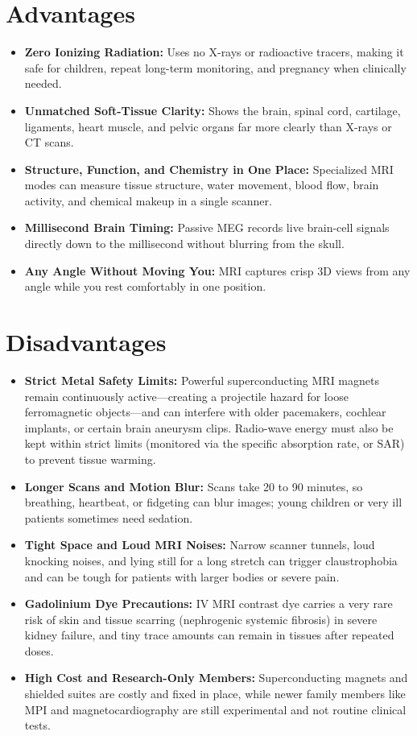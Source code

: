 \section{Advantages}
\begin{itemize}
  \item \textbf{Zero Ionizing Radiation:} Uses no X-rays or radioactive tracers, making it safe for children, repeat long-term monitoring, and pregnancy when clinically needed.
  \item \textbf{Unmatched Soft-Tissue Clarity:} Shows the brain, spinal cord, cartilage, ligaments, heart muscle, and pelvic organs far more clearly than X-rays or CT scans.
  \item \textbf{Structure, Function, and Chemistry in One Place:} Specialized MRI modes can measure tissue structure, water movement, blood flow, brain activity, and chemical makeup in a single scanner.
  \item \textbf{Millisecond Brain Timing:} Passive MEG records live brain-cell signals directly down to the millisecond without blurring from the skull.
  \item \textbf{Any Angle Without Moving You:} MRI captures crisp 3D views from any angle while you rest comfortably in one position.
\end{itemize}

\section{Disadvantages}
\begin{itemize}
  \item \textbf{Strict Metal Safety Limits:} Powerful superconducting MRI magnets remain continuously active---creating a projectile hazard for loose ferromagnetic objects---and can interfere with older pacemakers, cochlear implants, or certain brain aneurysm clips. Radio-wave energy must also be kept within strict limits (monitored via the specific absorption rate, or SAR) to prevent tissue warming.
  \item \textbf{Longer Scans and Motion Blur:} Scans take 20 to 90 minutes, so breathing, heartbeat, or fidgeting can blur images; young children or very ill patients sometimes need sedation.
  \item \textbf{Tight Space and Loud MRI Noises:} Narrow scanner tunnels, loud knocking noises, and lying still for a long stretch can trigger claustrophobia and can be tough for patients with larger bodies or severe pain.
  \item \textbf{Gadolinium Dye Precautions:} IV MRI contrast dye carries a very rare risk of skin and tissue scarring (nephrogenic systemic fibrosis) in severe kidney failure, and tiny trace amounts can remain in tissues after repeated doses.
  \item \textbf{High Cost and Research-Only Members:} Superconducting magnets and shielded suites are costly and fixed in place, while newer family members like MPI and magnetocardiography are still experimental and not routine clinical tests.
\end{itemize}

